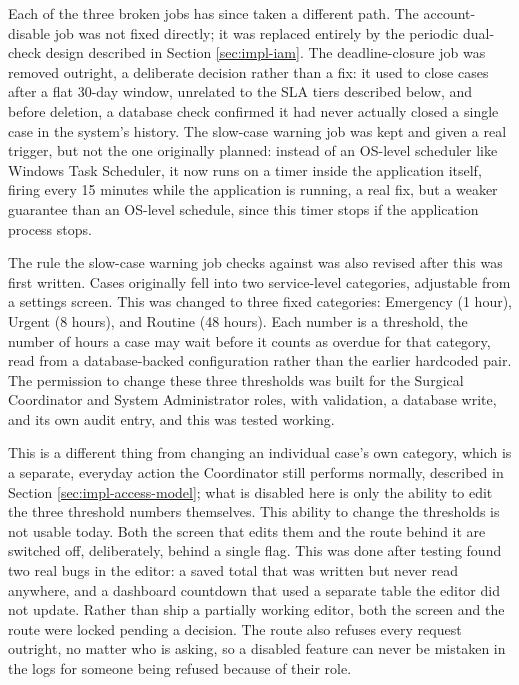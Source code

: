 Each of the three broken jobs has since taken a different path. The account-disable job was not fixed directly; it was replaced entirely by the periodic dual-check design described in Section \ref{sec:impl-iam}. The deadline-closure job was removed outright, a deliberate decision rather than a fix: it used to close cases after a flat 30-day window, unrelated to the SLA tiers described below, and before deletion, a database check confirmed it had never actually closed a single case in the system's history. The slow-case warning job was kept and given a real trigger, but not the one originally planned: instead of an OS-level scheduler like Windows Task Scheduler, it now runs on a timer inside the application itself, firing every 15 minutes while the application is running, a real fix, but a weaker guarantee than an OS-level schedule, since this timer stops if the application process stops.

The rule the slow-case warning job checks against was also revised after this was first written. Cases originally fell into two service-level categories, adjustable from a settings screen. This was changed to three fixed categories: Emergency (1 hour), Urgent (8 hours), and Routine (48 hours). Each number is a threshold, the number of hours a case may wait before it counts as overdue for that category, read from a database-backed configuration rather than the earlier hardcoded pair. The permission to change these three thresholds was built for the Surgical Coordinator and System Administrator roles, with validation, a database write, and its own audit entry, and this was tested working.

This is a different thing from changing an individual case's own category, which is a separate, everyday action the Coordinator still performs normally, described in Section \ref{sec:impl-access-model}; what is disabled here is only the ability to edit the three threshold numbers themselves. This ability to change the thresholds is not usable today. Both the screen that edits them and the route behind it are switched off, deliberately, behind a single flag. This was done after testing found two real bugs in the editor: a saved total that was written but never read anywhere, and a dashboard countdown that used a separate table the editor did not update. Rather than ship a partially working editor, both the screen and the route were locked pending a decision. The route also refuses every request outright, no matter who is asking, so a disabled feature can never be mistaken in the logs for someone being refused because of their role.

